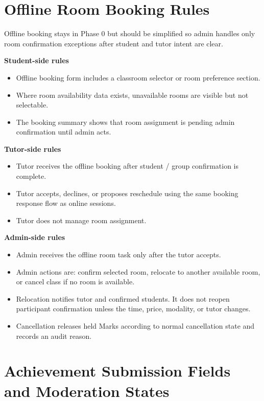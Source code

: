 \documentclass[11pt,a4paper]{article}
\begin{document}
\section{Offline Room Booking Rules}

Offline booking stays in Phase 0 but should be simplified so admin handles only room confirmation exceptions after student and tutor intent are clear.

\textbf{Student-side rules}
\begin{itemize}
    \item Offline booking form includes a classroom selector or room preference section.
    \item Where room availability data exists, unavailable rooms are visible but not selectable.
    \item The booking summary shows that room assignment is pending admin confirmation until admin acts.
\end{itemize}

\textbf{Tutor-side rules}
\begin{itemize}
    \item Tutor receives the offline booking after student / group confirmation is complete.
    \item Tutor accepts, declines, or proposes reschedule using the same booking response flow as online sessions.
    \item Tutor does not manage room assignment.
\end{itemize}

\textbf{Admin-side rules}
\begin{itemize}
    \item Admin receives the offline room task only after the tutor accepts.
    \item Admin actions are: confirm selected room, relocate to another available room, or cancel class if no room is available.
    \item Relocation notifies tutor and confirmed students. It does not reopen participant confirmation unless the time, price, modality, or tutor changes.
    \item Cancellation releases held Marks according to normal cancellation state and records an audit reason.
\end{itemize}

\section{Achievement Submission Fields and Moderation States}
\end{document}
